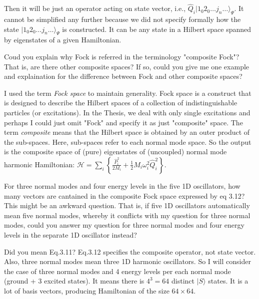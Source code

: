 \documentclass{exam}
\begin{document}
\begin{questions}
\begin{solution}
Then it will be just an operator acting on state vector, i.e., $\hat{Q}_i \vert 1_0 2_0 \ldots j_n \ldots \rangle_{\Psi}$.
It cannot be simplified any further because we did not specify formally how the state $\vert 1_0 2_0 \ldots j_n \ldots \rangle_{\Psi}$
is constructed. It can be any state in a Hilbert space spanned by eigenstates of a given Hamiltonian.
\end{solution}

%
\question Coud you explain why Fock is referred in the terminology "composite Fock"? 
That is, are there other composite spaces? If so, could you give me one example and explaination 
for the difference between Fock and other composite spaces?

\begin{solution}
I used the term \emph{Fock space} to maintain generality. Fock space is a construct that is designed to describe the Hilbert spaces
of a collection of indistinguishable particles (or excitations). 
In the Thesis, we deal with only single excitations and perhaps I could just
omit "Fock" and specify it as just "composite" space.
The term \emph{composite} means that the Hilbert space is obtained by 
an outer product of the sub-spaces. Here, sub-spaces refer to each normal mode space. So the output is the composite space
of (pure) eigenstates of (uncoupled) normal mode harmonic Hamiltonian: 
$\mathscr{H} = \sum_i \left\{ \frac{\hat{P}_i^2}{2M_i} + \frac{1}{2}M_i\omega_i^2 \hat{Q}_i^2 \right\}$.
\end{solution}

%
\question For three normal modes and four energy levels in the five 1D oscillators, 
how many vectors are cantained in the composite Fock space expressed by eq 3.12? 
This might be an awkward question. That is, if five 1D oscillators automatically 
mean five normal modes, whereby it conflicts with my question for three normal modes, 
could you answer my question for three normal modes and four energy levels in the separate 1D oscillator instead?

\begin{solution}
Did you mean Eq.3.11? Eq.3.12 specifies the composite operator, not state vector. 
Also, three normal modes mean three 1D harmonic oscillators. So I will consider 
the case of three normal modes and 4 energy levels per each normal mode (ground + 3 excited states). 
It means there is $4^3=64$ distinct
$\vert S \rangle$ states. It is a lot of basis vectors, producing Hamiltonian of the size $64\times 64$.
\end{solution}


\end{questions}
\end{document}
